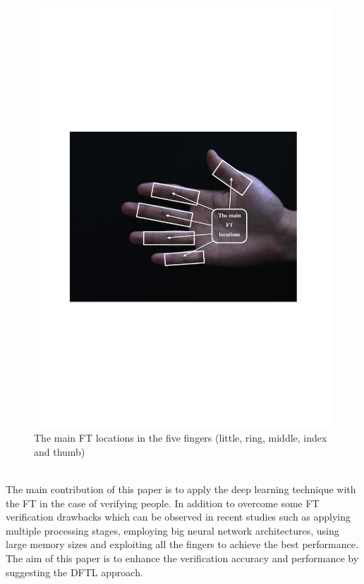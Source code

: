 \documentclass[conference]{IEEEtran}
\begin{document}
\begin{figure}[!h]
    \centering
    \includegraphics[page=1,scale=.5,trim=3cm 9cm 3cm 9cm,clip]{FT_locations_patterns.pdf}
    \caption{The main FT locations in the five fingers (little, ring, middle, index and thumb)}
    \label{fig:FT_locations}
\end{figure}\\
The main contribution of this paper is to apply the deep learning technique with the FT in the case of verifying people. In addition to overcome some FT verification drawbacks which can be observed in recent studies such as applying multiple processing stages, employing big neural network architectures, using large memory sizes and exploiting all the fingers to achieve the best performance.\\
The aim of this paper is to enhance the verification accuracy and performance by suggesting the DFTL approach.\\
\end{document}

